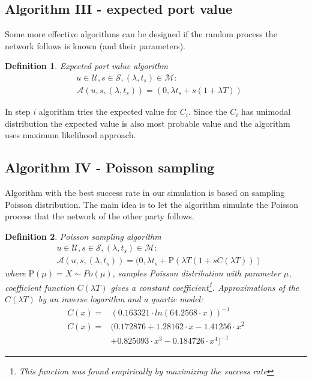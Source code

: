\documentclass[twoside]{article}
\newtheorem{mydef}{Definition}
\begin{document}
\begin{multicols}{2}
\subsection{Algorithm III - expected port value}
Some more effective algorithms can be designed if the random process the network follows is known (and their
parameters).

\begin{mydef}
Expected port value algorithm
\begin{align*}
& u \in \mathcal{U}, s \in \mathcal{S}, (\lambda, t_s) \in \mathcal{M}:\\
& \mathcal{A}(u, s, (\lambda, t_s)) = (0, \lambda t_s + s(1 + \lambda T))
\end{align*}
\end{mydef}

In step $i$ algorithm tries the expected value for $C_i$. Since the $C_i$ has unimodal distribution
the expected value is also most probable value and the algorithm uses maximum likelihood approach.

\subsection{Algorithm IV - Poisson sampling}
Algorithm with the best success rate in our simulation is based on sampling Poisson distribution.
The main idea is to let the algorithm simulate the Poisson process that the network of the
other party follows. 

\begin{mydef}
Poisson sampling algorithm 
\begin{align*}
& u \in \mathcal{U}, s \in \mathcal{S}, (\lambda, t_s) \in \mathcal{M}:\\
& \mathcal{A}(u, s, (\lambda, t_s)) = (0, \lambda t_s + \text{P}(\lambda T (1+s C(\lambda T)))
\end{align*} where $\text{P}(\mu) = X \sim Po(\mu)$, samples Poisson distribution with
parameter $\mu$, coefficient function $C(\lambda T)$ gives a constant 
coefficient\footnote{This function was found empirically by maximizing the success rate}.
Approximations of the $C(\lambda T)$ by an inverse logarithm and a quartic model:
\begin{align*}
C(x) = & ({0.163321 \cdot  ln(64.2568 \cdot x)})^{-1}\\
C(x) = & (0.172876+1.28162\cdot x-1.41256\cdot x^2 \\
       & +0.825093\cdot x^3-0.184726\cdot x^4)^{-1}
\end{align*}
\end{mydef}
% 

\end{multicols}
\end{document}

